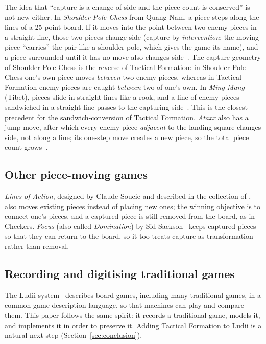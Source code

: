 The idea that ``capture is a change of side and the piece count is
conserved'' is not new either. In \emph{Shoulder-Pole Chess} from Quang Nam, a piece
steps along the lines of a 25-point board. If it moves into the point
between two enemy pieces in a straight line, those two pieces change side
(capture by \emph{intervention}: the moving piece ``carries'' the pair like a
shoulder pole, which gives the game its name), and a piece surrounded until it has no move also changes
side~\citep{mytour_coganh,fptshop_coganh}. The capture geometry of Shoulder-Pole Chess
is the reverse of Tactical Formation: in Shoulder-Pole Chess one's own piece moves \emph{between}
two enemy pieces, whereas in Tactical Formation enemy pieces are caught \emph{between}
two of one's own. In \emph{Ming Mang} (Tibet), pieces slide in straight lines
like a rook, and a line of enemy pieces sandwiched in a straight line passes
to the capturing side~\citep{wiki_mingmang}. This is the closest precedent
for the sandwich-conversion of Tactical Formation. \emph{Ataxx} also has a jump move,
after which every enemy piece \emph{adjacent} to the landing square changes
side, not along a line; its one-step move creates a new piece, so the total
piece count grows~\citep{gebop_ataxx}.

\subsection{Other piece-moving games}

\emph{Lines of Action}, designed by Claude Soucie and described in the
collection of \citet{sackson1969gamut}, also moves existing pieces instead
of placing new ones; the winning objective is to connect one's pieces, and
a captured piece is still removed from the board, as in Checkers. \emph{Focus} (also called \emph{Domination}) by
Sid Sackson~\citep{sackson1969gamut} keeps captured pieces so that they can
return to the board, so it too treats capture as transformation rather than
removal.

\subsection{Recording and digitising traditional games}

The Ludii system~\citep{piette2020ludii} describes board games, including
many traditional games, in a common game description language, so that
machines can play and compare them. This paper follows the same spirit: it
records a traditional game, models it, and implements it in order to
preserve it. Adding Tactical Formation to Ludii is a natural next step
(Section~\ref{sec:conclusion}).

